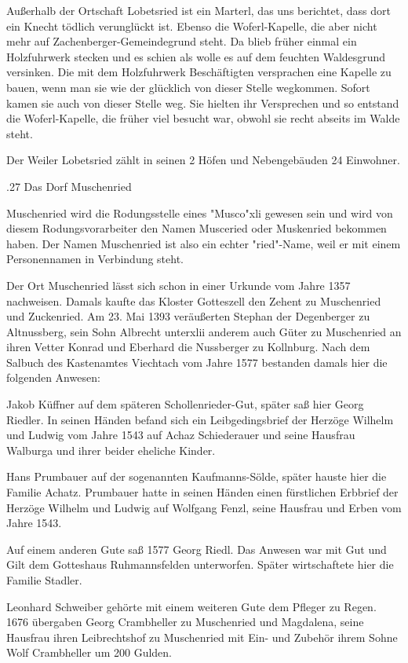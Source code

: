 Außerhalb der Ortschaft Lobetsried ist ein Marterl, das uns berichtet, dass dort
ein Knecht tödlich verunglückt ist. Ebenso die Woferl-Kapelle, die aber nicht
mehr auf Zachenberger-Gemeindegrund steht. Da blieb früher einmal ein
Holzfuhrwerk stecken und es schien als wolle es auf dem feuchten Waldesgrund
versinken. Die mit dem Holzfuhrwerk Beschäftigten versprachen eine Kapelle zu
bauen, wenn man sie wie der glücklich von dieser Stelle wegkommen. Sofort kamen
sie auch von dieser Stelle weg. Sie hielten ihr Versprechen und so entstand die
Woferl-Kapelle, die früher viel besucht war, obwohl sie recht abseits im Walde
steht.

Der Weiler Lobetsried zählt in seinen 2 Höfen und Nebengebäuden 24 Einwohner.

.27 Das Dorf Muschenried

Muschenried wird die Rodungsstelle eines "Musco"xli gewesen sein und wird von
diesem Rodungsvorarbeiter den Namen Musceried oder Muskenried bekommen haben.
Der Namen Muschenried ist also ein echter "ried"-Name, weil er mit einem
Personennamen in Verbindung steht.

Der Ort Muschenried lässt sich schon in einer Urkunde vom Jahre 1357 nachweisen.
Damals kaufte das Kloster Gotteszell den Zehent zu Muschenried und Zuckenried.
Am 23. Mai 1393 veräußerten Stephan der Degenberger zu Altnussberg, sein Sohn
Albrecht unterxlii anderem auch Güter zu Muschenried an ihren Vetter Konrad und
Eberhard die Nussberger zu Kollnburg. Nach dem Salbuch des Kastenamtes Viechtach
vom Jahre 1577 bestanden damals hier die folgenden Anwesen:



Jakob Küffner auf dem späteren Schollenrieder-Gut, später saß hier Georg
Riedler. In seinen Händen befand sich ein Leibgedingsbrief der Herzöge Wilhelm
und Ludwig vom Jahre 1543 auf Achaz Schiederauer und seine Hausfrau Walburga und
ihrer beider eheliche Kinder.

Hans Prumbauer auf der sogenannten Kaufmanns-Sölde, später hauste hier die
Familie Achatz. Prumbauer hatte in seinen Händen einen fürstlichen Erbbrief der
Herzöge Wilhelm und Ludwig auf Wolfgang Fenzl, seine Hausfrau und Erben vom
Jahre 1543.

Auf einem anderen Gute saß 1577 Georg Riedl. Das Anwesen war mit Gut und Gilt
dem Gotteshaus Ruhmannsfelden unterworfen. Später wirtschaftete hier die Familie
Stadler.

Leonhard Schweiber gehörte mit einem weiteren Gute dem Pfleger zu Regen. 1676
übergaben Georg Crambheller zu Muschenried und Magdalena, seine Hausfrau ihren
Leibrechtshof zu Muschenried mit Ein- und Zubehör ihrem Sohne Wolf Crambheller
um 200 Gulden.



